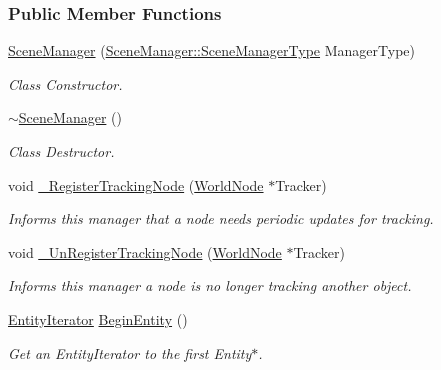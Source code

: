 \subsubsection*{Public Member Functions}
\begin{DoxyCompactItemize}
\item 
\hyperlink{classMezzanine_1_1SceneManager_a5f26c1c9b6714b48ad486e289eca16d0}{SceneManager} (\hyperlink{classMezzanine_1_1SceneManager_ad6e20c08b97a230314abda3e5826f274}{SceneManager::SceneManagerType} ManagerType)
\begin{DoxyCompactList}\small\item\em Class Constructor. \item\end{DoxyCompactList}\item 
\hyperlink{classMezzanine_1_1SceneManager_a8becb78de62a9e5c66c213066e7a421b}{$\sim$SceneManager} ()
\begin{DoxyCompactList}\small\item\em Class Destructor. \item\end{DoxyCompactList}\item 
void \hyperlink{classMezzanine_1_1SceneManager_ae5db6928dd653974b1d5b9076e9be2e2}{\_\-RegisterTrackingNode} (\hyperlink{classMezzanine_1_1WorldNode}{WorldNode} $\ast$Tracker)
\begin{DoxyCompactList}\small\item\em Informs this manager that a node needs periodic updates for tracking. \item\end{DoxyCompactList}\item 
void \hyperlink{classMezzanine_1_1SceneManager_a850cf7390472c3a80aa9b278a8c82268}{\_\-UnRegisterTrackingNode} (\hyperlink{classMezzanine_1_1WorldNode}{WorldNode} $\ast$Tracker)
\begin{DoxyCompactList}\small\item\em Informs this manager a node is no longer tracking another object. \item\end{DoxyCompactList}\item 
\hyperlink{classMezzanine_1_1SceneManager_a1e2d6cd6454bb900b31762eab8effc8b}{EntityIterator} \hyperlink{classMezzanine_1_1SceneManager_abc6dd9387dac2ae2aef9502d01d1ec35}{BeginEntity} ()
\begin{DoxyCompactList}\small\item\em Get an EntityIterator to the first Entity$\ast$. \item\end{DoxyCompactList}\item 

\end{DoxyCompactItemize}

